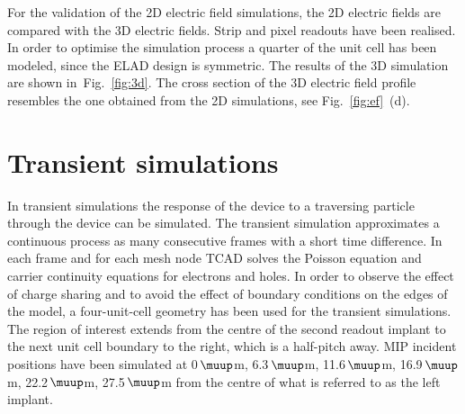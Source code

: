 \documentclass[a4paper,11pt]{article}
\begin{document}
For the validation of the 2D electric field simulations, the 2D electric fields are compared with the 3D electric fields.
Strip and pixel readouts have been realised. 
In order to optimise the simulation process a quarter of the unit cell has been modeled, since the ELAD design is symmetric.
The results of the 3D simulation are shown in~Fig.~\ref{fig:3d}.
The cross section of the 3D electric field profile resembles the one obtained from the 2D simulations, see Fig.~\ref{fig:ef}~(d). 


\section{Transient simulations}
\label{sec:tr}
In transient simulations the response of the device to a traversing particle through the device can be simulated. 
The transient simulation approximates a continuous process as many consecutive frames with a short time difference. 
In each frame and for each mesh node TCAD solves the Poisson equation and carrier continuity equations for electrons and holes.
In order to observe the effect of charge sharing and to avoid the effect of boundary conditions on the edges of the model, a four-unit-cell geometry has been used for the transient simulations. 
The region of interest extends from the centre of the second readout implant to the next unit cell boundary to the right, which is a half-pitch away.  
MIP incident positions have been simulated at 0\,$\muup$m, 6.3\,$\muup$m, 11.6\,$\muup$m, 16.9\,$\muup$m, 22.2\,$\muup$m, 27.5\,$\muup$m from the centre of what is referred to as the left implant.
\end{document}
